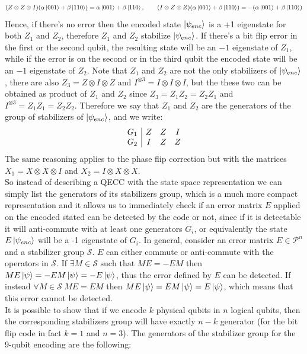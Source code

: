 \documentclass{article}
\begin{document}
	\[(Z\otimes Z \otimes I)(\alpha\ket{001} + \beta\ket{110}) = \alpha\ket{001} + \beta\ket{110},\qquad (I\otimes Z \otimes Z)(\alpha\ket{001} + \beta\ket{110}) = -(\alpha\ket{001} + \beta\ket{110})\]
	Hence, if there's no error then the encoded state $\ket{\psi_{enc}}$ is a +1 eigenstate for both $Z_1$ and $Z_2$, therefore $Z_1$ and $Z_2$ stabilize $\ket{\psi_{enc}}$. If there's a bit flip error in the first or the second qubit, the resulting state will be an $-1$ eigenstate of $Z_1$, while if the error is on the second or in the third qubit the encoded state will be an $-1$ eigenstate of $Z_2$. Note that $Z_1$ and $Z_2$ are not the only stabilizers of $\ket{\psi_{enc}}$, there are also $Z_3 = Z \otimes I \otimes Z$ and $I^{\otimes3} = I\otimes I \otimes I$, but the these two can be obtained as product of $Z_1$ and $Z_2$ since $Z_3 = Z_1Z_2 = Z_2Z_1$ and $I^{\otimes3} = Z_1Z_1 = Z_2Z_2$. Therefore we say that $Z_1$ and $Z_2$ are the generators of the group of stabilizers of $\ket{\psi_{enc}}$, and we write:
	\[
	\begin{array}{c|c c c}
		G_1 & Z & Z & I \\
		G_2 & I & Z & Z \\
	\end{array}
	\]
	The same reasoning applies to the phase flip correction but with the matrices $X_1 = X\otimes X \otimes I$ and $X_2 = I \otimes X \otimes X$.\\
	So instead of describing a QECC with the state space representation we can simply list the generators of its stabilizers group, which is a much more compact representation and it allows us to immediately check if an error matrix $E$ applied on the encoded stated can be detected by the code or not, since if it is detectable it will anti-commute with at least one generators $G_i$, or equivalently the state $E\ket{\psi_{enc}}$ will be a -1 eigenstate of $G_i$. In general, consider an error matrix $E \in \mathcal{P}^n$ and a stabilizer group $\mathcal{S}$. $E$ can either commute or anti-commute with the operators in $\mathcal{S}$. If $\exists M \in \mathcal{S} \text{ such that } ME = -EM$ then $ME\ket{\psi} = -EM\ket{\psi} = -E\ket{\psi}$, thus the error defined by $E$ can be detected. If instead $\forall M \in \mathcal{S}\ ME = EM$ then $ME\ket{\psi} = EM\ket{\psi} = E\ket{\psi}$, which means that this error cannot be detected.\\
	It is possible to show that if we encode $k$ physical qubits in $n$ logical qubits, then the corresponding stabilizers group will have exactly $n-k$ generator (for the bit flip code in fact $k=1$ and $n=3$). The generators of the stabilizer group for the 9-qubit encoding are the following:
\end{document}
